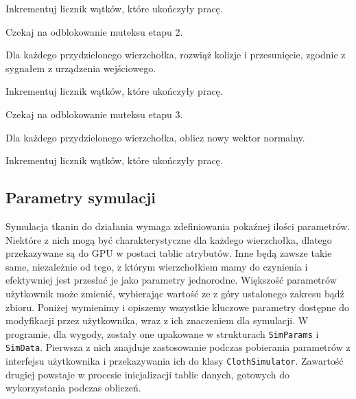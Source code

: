 \begin{algorithm}
{				Inkrementuj licznik wątków, które ukończyły pracę.
				
				Czekaj na odblokowanie muteksu etapu 2.
				
				Dla każdego przydzielonego wierzchołka, rozwiąż kolizje i przesunięcie, zgodnie z sygnałem z urządzenia wejściowego.
				
				Inkrementuj licznik wątków, które ukończyły pracę.
				
				Czekaj na odblokowanie muteksu etapu 3.
				
				Dla każdego przydzielonego wierzchołka, oblicz nowy wektor normalny.
				
				Inkrementuj licznik wątków, które ukończyły pracę.
			}
			
			\Indm
		\end{algorithm}
	
		\subsection{Parametry symulacji}
		\label{t:symulacja:dzialanie:parametry}
			
		
		Symulacja tkanin do działania wymaga zdefiniowania pokaźnej ilości parametrów. Niektóre z nich mogą być charakterystyczne dla każdego wierzchołka, dlatego przekazywane są do GPU w postaci tablic atrybutów. Inne będą zawsze takie same, niezależnie od tego, z którym wierzchołkiem mamy do czynienia i efektywniej jest przesłać je jako parametry jednorodne. Większość parametrów użytkownik może zmienić, wybierając wartość ze z góry ustalonego zakresu bądź zbioru. Poniżej wymienimy i opiszemy wszystkie kluczowe parametry dostępne do modyfikacji przez użytkownika, wraz z ich znaczeniem dla symulacji. W programie, dla wygody, zostały one upakowane w strukturach \texttt{SimParams} i \texttt{SimData}. Pierwsza z nich znajduje zastosowanie podczas pobierania parametrów z interfejsu użytkownika i przekazywania ich do klasy \texttt{ClothSimulator}. Zawartość drugiej powstaje w procesie inicjalizacji tablic danych, gotowych do wykorzystania podczas obliczeń.
		
